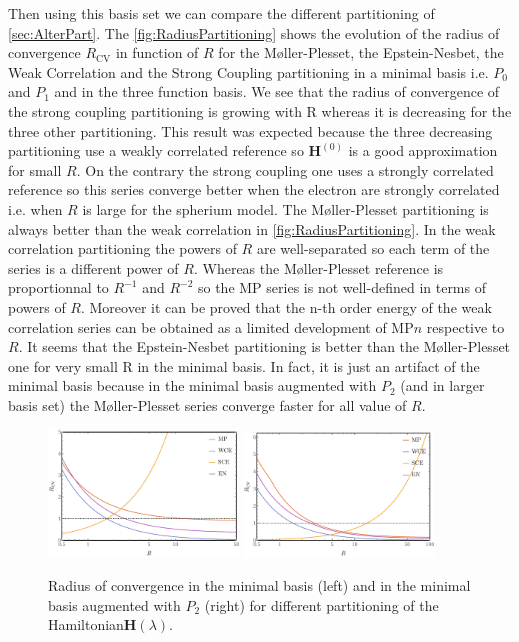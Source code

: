 \documentclass[11pt,a4paper]{article}
\newcommand{\bH}{\mathbf{H}}
\begin{document}
Then using this basis set we can compare the different partitioning of \autoref{sec:AlterPart}. The \autoref{fig:RadiusPartitioning} shows the evolution of the radius of convergence $R_{\text{CV}}$ in function of $R$ for the M{\o}ller-Plesset, the Epstein-Nesbet, the Weak Correlation and the Strong Coupling partitioning in a minimal basis i.e. $P_0$ and $P_1$ and in the three function basis. We see that the radius of convergence of the strong coupling partitioning is growing with R whereas it is decreasing for the three other partitioning. This result was expected because the three decreasing partitioning use a weakly correlated reference so $\bH^{(0)}$ is a good approximation for small $R$. On the contrary the strong coupling one uses a strongly correlated reference so this series converge better when the electron are strongly correlated i.e. when $R$ is large for the spherium model.
The M{\o}ller-Plesset partitioning is always better than the weak correlation in \autoref{fig:RadiusPartitioning}. In the weak correlation partitioning the powers of $R$ are well-separated so each term of the series is a different power of $R$. Whereas the M{\o}ller-Plesset reference is proportionnal to $R^{-1}$ and $R^{-2}$ so the MP series is not well-defined in terms of powers of $R$. Moreover it can be proved that the n-th order energy of the weak correlation series can be obtained as a limited development of MP$n$ respective to $R$. It seems that the Epstein-Nesbet partitioning is better than the M{\o}ller-Plesset one for very small R in the minimal basis. In fact, it is just an artifact of the minimal basis because in the minimal basis augmented with $P_2
$ (and in larger basis set) the M{\o}ller-Plesset series converge faster for all value of $R$.

\begin{figure}[h!]
    \centering
    \includegraphics[width=0.45\textwidth]{PartitioningRCV2.pdf}
    \includegraphics[width=0.45\textwidth]{PartitioningRCV3.pdf}
    \caption{\centering Radius of convergence in the minimal basis (left) and in the minimal basis augmented with $P_2$ (right) for different partitioning of the Hamiltonian$\bH(\lambda)$.}
    \label{fig:RadiusPartitioning}
\end{figure}
\end{document}
